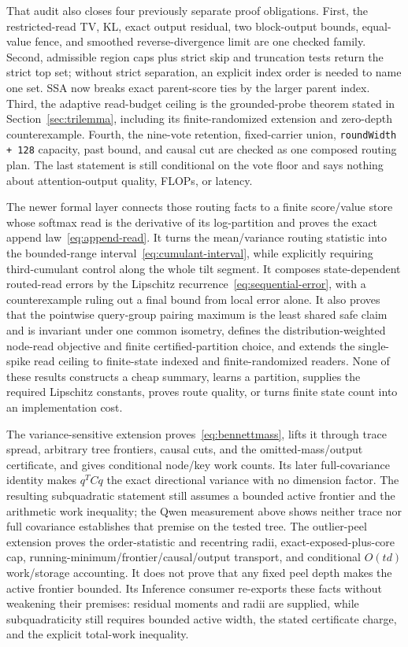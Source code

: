 \documentclass[11pt]{article}
\numberwithin{equation}{section}
\begin{document}
That audit also closes four previously separate proof obligations. First, the restricted-read TV, KL, exact
output residual, two block-output bounds, equal-value fence, and smoothed reverse-divergence limit are one
checked family. Second, admissible region caps plus strict skip and truncation tests return the strict top set;
without strict separation, an explicit index order is needed to name one set. SSA now breaks exact parent-score
ties by the larger parent index. Third, the adaptive read-budget ceiling is the grounded-probe theorem stated
in Section~\ref{sec:trilemma}, including its finite-randomized extension and zero-depth counterexample. Fourth,
the nine-vote retention, fixed-carrier union, \texttt{roundWidth + 128} capacity, past bound, and causal cut are
checked as one composed routing plan. The last statement is still conditional on the vote floor and says
nothing about attention-output quality, FLOPs, or latency.

The newer formal layer connects those routing facts to a finite score/value store whose softmax read is the
derivative of its log-partition and proves the exact append law~\eqref{eq:append-read}. It turns the
mean/variance routing statistic into the bounded-range interval~\eqref{eq:cumulant-interval}, while explicitly
requiring third-cumulant control along the whole tilt segment. It composes state-dependent routed-read errors
by the Lipschitz recurrence~\eqref{eq:sequential-error}, with a counterexample ruling out a final bound from
local error alone. It also proves that the pointwise query-group pairing maximum is the least shared safe
claim and is invariant under one common isometry, defines the distribution-weighted node-read objective and
finite certified-partition choice, and extends the single-spike read ceiling to finite-state indexed and
finite-randomized readers. None of these results constructs a cheap summary, learns a partition, supplies the
required Lipschitz constants, proves route quality, or turns finite state count into an implementation cost.

The variance-sensitive extension proves~\eqref{eq:bennettmass}, lifts it through trace spread, arbitrary tree
frontiers, causal cuts, and the omitted-mass/output certificate, and gives conditional node/key work counts.
Its later full-covariance identity makes $q^TCq$ the exact directional variance with no dimension factor. The
resulting subquadratic statement still assumes a bounded active frontier and the arithmetic work inequality;
the Qwen measurement above shows neither trace nor full covariance establishes that premise on the tested
tree. The outlier-peel extension proves the order-statistic and recentring radii,
exact-exposed-plus-core cap, running-minimum/frontier/causal/output transport, and conditional $O(td)$
work/storage accounting. It does not prove that any fixed peel depth makes the active frontier bounded. Its
Inference consumer re-exports these facts without weakening their premises: residual moments and radii are
supplied, while subquadraticity still requires bounded active width, the stated certificate charge, and the
explicit total-work inequality.
\end{document}
